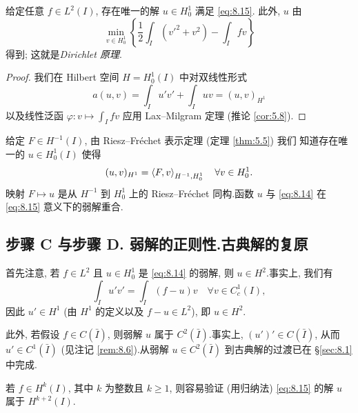 \begin{keyproposition}
\label{prop:8.15}
给定任意 $f\in L^2(I)$, 存在唯一的解 $u\in H_0^1$ 满足 \eqref{eq:8.15}.
此外, $u$ 由
\begin{equation*}
\boxed{\min_{v\in H_0^1}\left\{\frac12\int_I(v'^2+v^2)-\int_I fv\right\}}
\end{equation*}
得到; 这就是\emph{Dirichlet 原理}.
\end{keyproposition}

\begin{proof}
我们在 Hilbert 空间 $H=H_0^1(I)$ 中对双线性形式
\begin{equation*}
a(u,v)=\int_I u'v'+\int_I uv=(u,v)_{H^1}
\end{equation*}
以及线性泛函 $\varphi:v\mapsto\int_I fv$ 应用 Lax--Milgram 定理 (推论
 \ref{cor:5.8}).
\end{proof}

\begin{remark}
\label{rem:8.22}
给定 $F\in H^{-1}(I)$, 由 Riesz--Fréchet 表示定理 (定理  \ref{thm:5.5}) 我们
知道存在唯一的 $u\in H_0^1(I)$ 使得
\begin{equation*}
(u,v)_{H^1}=\left\langle F,v\right\rangle_{H^{-1},H_0^1}\quad\forall v\in H_0^1.
\end{equation*}
映射 $F\mapsto u$ 是从 $H^{-1}$ 到 $H_0^1$ 上的 Riesz--Fréchet 同构.函数 $u$
与 \eqref{eq:8.14} 在 \eqref{eq:8.15} 意义下的弱解重合.
\end{remark}

\subsection*{步骤 C 与步骤 D. 弱解的正则性.古典解的复原}

首先注意, 若 $f\in L^2$ 且 $u\in H_0^1$ 是 \eqref{eq:8.14} 的弱解, 则
$u\in H^2$.事实上, 我们有
\begin{equation*}
\int_I u'v'=\int_I(f-u)v\quad\forall v\in C_c^1(I),
\end{equation*}
因此 $u'\in H^1$ (由 $H^1$ 的定义以及 $f-u\in L^2$), 即 $u\in H^2$.

此外, 若假设 $f\in C(\bar I)$, 则弱解 $u$ 属于 $C^2(\bar I)$.事实上,
$(u')'\in C(\bar I)$, 从而 $u'\in C^1(\bar I)$ (见注记 \ref{rem:8.6}).从弱解
$u\in C^2(\bar I)$ 到古典解的过渡已在 \S \ref{sec:8.1} 中完成.

\begin{remark}
\label{rem:8.23}
若 $f\in H^k(I)$, 其中 $k$ 为整数且 $k\ge1$, 则容易验证 (用归纳法)
\eqref{eq:8.15} 的解 $u$ 属于 $H^{k+2}(I)$.
\end{remark}

